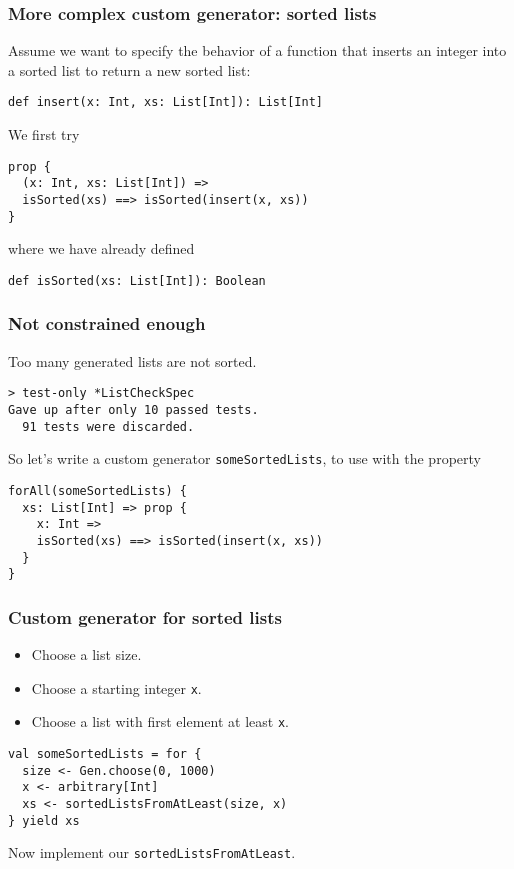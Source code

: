 \begin{frame}[fragile]
  \frametitle{More complex custom generator: sorted lists}

  Assume we want to specify the behavior of a function that inserts an integer into a sorted list to return a new sorted list:
  \begin{verbatim}
def insert(x: Int, xs: List[Int]): List[Int]
  \end{verbatim}
  
  We first try
  \begin{verbatim}
prop {
  (x: Int, xs: List[Int]) =>
  isSorted(xs) ==> isSorted(insert(x, xs))
}
  \end{verbatim}

  where we have already defined
  \begin{verbatim}
def isSorted(xs: List[Int]): Boolean
  \end{verbatim}

\end{frame}

\begin{frame}[fragile]
  \frametitle{Not constrained enough}

  Too many generated lists are not sorted.

  \begin{verbatim}
> test-only *ListCheckSpec
Gave up after only 10 passed tests.
  91 tests were discarded.
  \end{verbatim}

  So let's write a custom generator \texttt{someSortedLists}, to use with the property
  \begin{verbatim}
forAll(someSortedLists) {
  xs: List[Int] => prop {
    x: Int =>
    isSorted(xs) ==> isSorted(insert(x, xs))
  }
}
  \end{verbatim}
\end{frame}

\begin{frame}[fragile]
  \frametitle{Custom generator for sorted lists}

  \begin{itemize}
    \item Choose a list size.
    \item Choose a starting integer \texttt{x}.
    \item Choose a list with first element at least \texttt{x}.
  \end{itemize}

  \begin{verbatim}
val someSortedLists = for {
  size <- Gen.choose(0, 1000)
  x <- arbitrary[Int]
  xs <- sortedListsFromAtLeast(size, x)
} yield xs
  \end{verbatim}

  Now implement our \texttt{sortedListsFromAtLeast}.
\end{frame}

